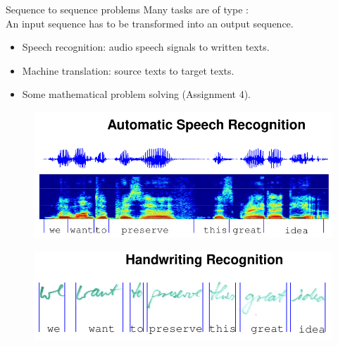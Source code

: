 \begin{frame}{Sequence to sequence problems}
\vspace{-3mm}
Many tasks are of type :\\
An input sequence has to be transformed into an output sequence.
\vsp
\begin{itemize}
\item Speech recognition: audio speech signals to written texts.
\item Machine translation: source texts to target texts.
\item Some mathematical problem solving (Assignment 4).
\end{itemize}
\vsp
\begin{minipage}{0.45\linewidth}
\begin{figure}
  \begin{center}
    \includegraphics[width=0.9\linewidth]{figures/asr_illu.png}
  \end{center}
\end{figure}
\end{minipage}
\begin{minipage}{0.45\linewidth}
\begin{figure}
  \begin{center}
    \includegraphics[width=0.9\linewidth]{figures/hw_illu.png}
  \end{center}
\end{figure}
\end{minipage}\\
\vsp
 \begin{minipage}{0.45\linewidth}

\end{minipage}
\end{frame}
